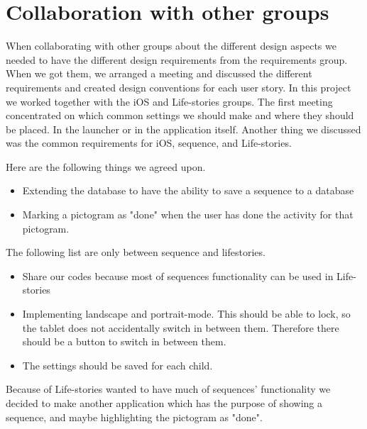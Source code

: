 \section{Collaboration with other groups}
\label{sec:collab}
When collaborating with other groups about the different design aspects we needed to have the different design requirements from the requirements group.
When we got them, we arranged a meeting and discussed the different requirements and created design conventions for each user story.
In this project we worked together with the iOS and Life-stories groups.
The first meeting concentrated on which common settings we should make and where they should be placed. In the launcher or in the application itself. 
Another thing we discussed was the common requirements for iOS, sequence, and Life-stories. 

Here are the following things we agreed upon.
\begin{itemize}
\item Extending the database to have the ability to save a sequence to a database
\item Marking a pictogram as "done" when the user has done the activity for that pictogram.
\end{itemize}

The following list are only between sequence and lifestories. 
\begin{itemize}
\item Share our codes because most of sequences functionality can be used in Life-stories
\item Implementing landscape and portrait-mode. This should be able to lock, so the tablet does not accidentally switch in between them. Therefore there should be a button to switch in between them.
\item The settings should be saved for each child.
\end{itemize}

Because of Life-stories wanted to have much of sequences' functionality we decided to make another application which has the purpose of showing a sequence, and maybe highlighting the pictogram as "done".

